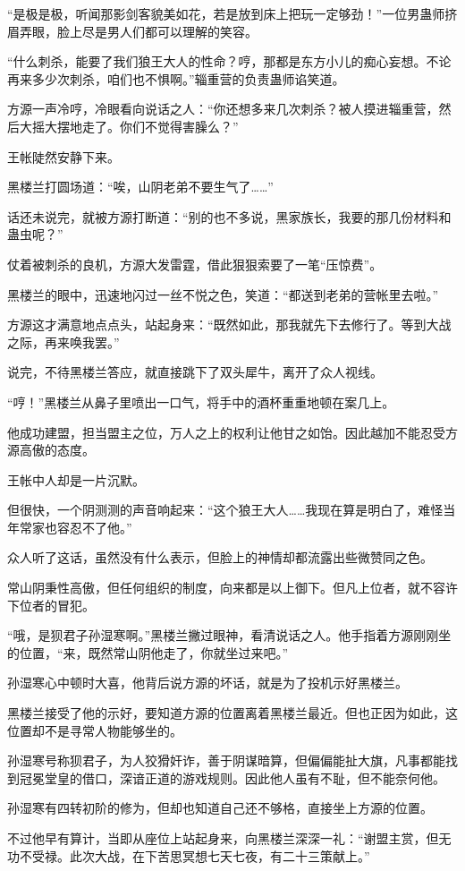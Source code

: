 \begin{this_body}
“是极是极，听闻那影剑客貌美如花，若是放到床上把玩一定够劲！”一位男蛊师挤眉弄眼，脸上尽是男人们都可以理解的笑容。

“什么刺杀，能要了我们狼王大人的性命？哼，那都是东方小儿的痴心妄想。不论再来多少次刺杀，咱们也不惧啊。”辎重营的负责蛊师谄笑道。

方源一声冷哼，冷眼看向说话之人：“你还想多来几次刺杀？被人摸进辎重营，然后大摇大摆地走了。你们不觉得害臊么？”

王帐陡然安静下来。

黑楼兰打圆场道：“唉，山阴老弟不要生气了……”

话还未说完，就被方源打断道：“别的也不多说，黑家族长，我要的那几份材料和蛊虫呢？”

仗着被刺杀的良机，方源大发雷霆，借此狠狠索要了一笔“压惊费”。

黑楼兰的眼中，迅速地闪过一丝不悦之色，笑道：“都送到老弟的营帐里去啦。”

方源这才满意地点点头，站起身来：“既然如此，那我就先下去修行了。等到大战之际，再来唤我罢。”

说完，不待黑楼兰答应，就直接跳下了双头犀牛，离开了众人视线。

“哼！”黑楼兰从鼻子里喷出一口气，将手中的酒杯重重地顿在案几上。

他成功建盟，担当盟主之位，万人之上的权利让他甘之如饴。因此越加不能忍受方源高傲的态度。

王帐中人却是一片沉默。

但很快，一个阴测测的声音响起来：“这个狼王大人……我现在算是明白了，难怪当年常家也容忍不了他。”

众人听了这话，虽然没有什么表示，但脸上的神情却都流露出些微赞同之色。

常山阴秉性高傲，但任何组织的制度，向来都是以上御下。但凡上位者，就不容许下位者的冒犯。

“哦，是狈君子孙湿寒啊。”黑楼兰撇过眼神，看清说话之人。他手指着方源刚刚坐的位置，“来，既然常山阴他走了，你就坐过来吧。”

孙湿寒心中顿时大喜，他背后说方源的坏话，就是为了投机示好黑楼兰。

黑楼兰接受了他的示好，要知道方源的位置离着黑楼兰最近。但也正因为如此，这位置却不是寻常人物能够坐的。

孙湿寒号称狈君子，为人狡猾奸诈，善于阴谋暗算，但偏偏能扯大旗，凡事都能找到冠冕堂皇的借口，深谙正道的游戏规则。因此他人虽有不耻，但不能奈何他。

孙湿寒有四转初阶的修为，但却也知道自己还不够格，直接坐上方源的位置。

不过他早有算计，当即从座位上站起身来，向黑楼兰深深一礼：“谢盟主赏，但无功不受禄。此次大战，在下苦思冥想七天七夜，有二十三策献上。”


\end{this_body}
